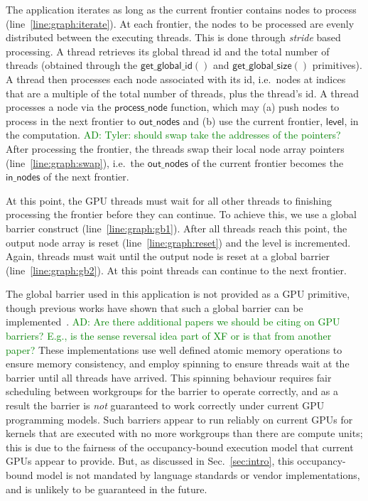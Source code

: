 \documentclass[numbers,nocopyrightspace,10pt]{sigplanconf}
\newcommand{\ADComment}[1]{\textcolor{green}{AD: #1}}
\newcommand{\mysec}{Sec.~}
\newcommand{\getglobalid}{\mathsf{get\_global\_id}}
\newcommand{\getglobalsize}{\mathsf{get\_global\_size}}
\newcommand{\keyword}[1]{\mathsf{#1}}
\begin{document}
The application iterates as long as the current frontier contains
nodes to process (line~\ref{line:graph:iterate}). At each frontier,
the nodes to be processed are evenly distributed between the executing
threads. This is done through \emph{stride} based processing. A thread
retrieves its global thread id and the total number of threads
(obtained through the $\getglobalid()$ and $\getglobalsize()$ primitives). A thread then processes
each node associated with its id, i.e.\ nodes at indices that are a multiple of the total number of threads, plus the thread's id. A thread processes a node via the $\keyword{process\_node}$
function, which may (a) push nodes to process in the next frontier to
$\keyword{out\_nodes}$ and (b) use the current frontier, $\keyword{level}$, in
the computation. \ADComment{Tyler: should swap take the addresses of the pointers?} After processing the frontier, the threads swap their
local node array pointers (line~\ref{line:graph:swap}), i.e.\ the $\keyword{out\_nodes}$ of the current frontier becomes the $\keyword{in\_nodes}$ of the next
frontier.

At this point, the GPU threads must wait for all other threads to
finishing processing the frontier before they can continue. To achieve
this, we use a global barrier construct
(line~\ref{line:graph:gb1}). After all threads reach this point, the
output node array is reset (line~\ref{line:graph:reset}) and the level
is incremented. Again, threads must wait until the output node is
reset at a global barrier (line~\ref{line:graph:gb2}). At this point
threads can continue to the next frontier.

The global barrier used in this application is not provided as a GPU
primitive, though previous works have shown that such a global
barrier can be implemented~\cite{XF10,DBLP:conf/oopsla/SorensenDBGR16}. \ADComment{Are there additional papers we should be citing on GPU barriers?  E.g., is the sense reversal idea part of XF or is that from another paper?}  These implementations use well
defined atomic memory operations to ensure memory consistency, and
employ spinning to ensure threads wait at the barrier until all
threads have arrived.  This spinning behaviour requires fair
scheduling between workgroups for the barrier to operate correctly,
and as a result the barrier is \emph{not} guaranteed to work correctly
under current GPU programming models.  Such barriers appear to run
reliably on current GPUs for kernels that are executed with no more
workgroups than there are compute units; this is due to the fairness
of the occupancy-bound execution model that current GPUs appear to
provide.  But, as discussed in \mysec\ref{sec:intro}, this
occupancy-bound model is not mandated by language standards or vendor
implementations, and is unlikely to be guaranteed in the future.
\end{document}
